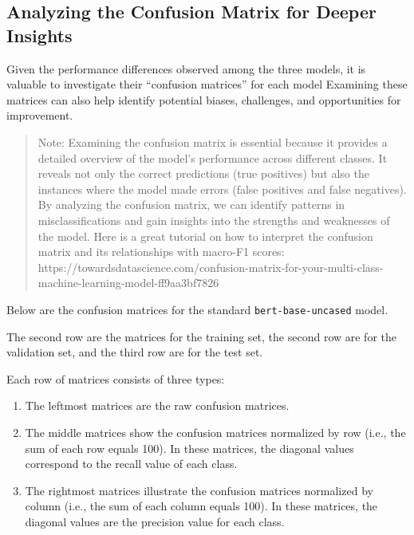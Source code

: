 \documentclass[11pt]{article}
\providecommand{\tightlist}{%
      \setlength{\itemsep}{0pt}\setlength{\parskip}{0pt}}
\begin{document}
    \hypertarget{analyzing-the-confusion-matrix-for-deeper-insights}{%
\subsection{Analyzing the Confusion Matrix for Deeper
Insights}\label{analyzing-the-confusion-matrix-for-deeper-insights}}

    Given the performance differences observed among the three models, it is
valuable to investigate their ``confusion matrices'' for each model
Examining these matrices can also help identify potential biases,
challenges, and opportunities for improvement.

    \begin{quote}
Note: Examining the confusion matrix is essential because it provides a
detailed overview of the model's performance across different classes.
It reveals not only the correct predictions (true positives) but also
the instances where the model made errors (false positives and false
negatives). By analyzing the confusion matrix, we can identify patterns
in misclassifications and gain insights into the strengths and
weaknesses of the model. Here is a great tutorial on how to interpret
the confusion matrix and its relationships with macro-F1 scores:
https://towardsdatascience.com/confusion-matrix-for-your-multi-class-machine-learning-model-ff9aa3bf7826
\end{quote}

    Below are the confusion matrices for the standard
\texttt{bert-base-uncased} model.

The second row are the matrices for the training set, the second row are
for the validation set, and the third row are for the test set.

Each row of matrices consists of three types:

\begin{enumerate}
\def\labelenumi{\arabic{enumi}.}
\tightlist
\item
  The leftmost matrices are the raw confusion matrices.
\item
  The middle matrices show the confusion matrices normalized by row
  (i.e., the sum of each row equals 100). In these matrices, the
  diagonal values correspond to the recall value of each class.
\item
  The rightmost matrices illustrate the confusion matrices normalized by
  column (i.e., the sum of each column equals 100). In these matrices,
  the diagonal values are the precision value for each class.
\end{enumerate}
\end{document}
